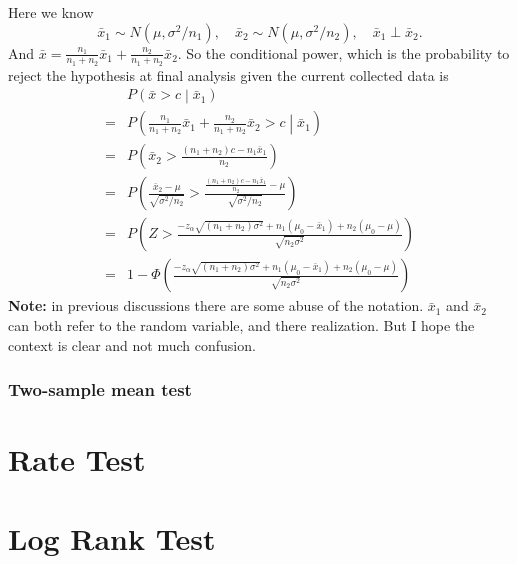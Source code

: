 \documentclass[a4paper,12pt]{article}
\begin{document}
Here we know
\[
  \bar{x}_1 \sim N\left(\mu, \sigma^2 / n_1\right)
  ,\quad
  \bar{x}_2 \sim N\left(\mu, \sigma^2 / n_2\right)
  ,\quad
  \bar{x}_1 \perp \bar{x}_2
  .
\]
And $\bar{x} = \frac{n_1}{n_1 + n_2}\bar{x}_1 + \frac{n_2}{n_1 + n_2}\bar{x}_2$. So the conditional power, which is the probability to reject the hypothesis at final analysis given the current collected data is
\begin{equation}
  \label{eq:cp_normal_sigma_known_one_sample}
  \begin{aligned}
    & P\left(\bar{x} > c \middle| \bar{x}_1\right)    \\
    =& P\left(
      \frac{n_1}{n_1 + n_2}\bar{x}_1 + \frac{n_2}{n_1 + n_2}\bar{x}_2 > c\middle| \bar{x}_1
    \right)    \\
    =& P\left(
      \bar{x}_2 > \frac{\left(n_1 + n_2\right)c - n_1\bar{x}_1}{n_2}
    \right)    \\
    =& P\left(
      \frac{\bar{x}_2 - \mu}{\sqrt{\sigma^2/n_2}}
      > \frac{
        \frac{\left(n_1 + n_2\right)c - n_1\bar{x}_1}{n_2}- \mu
      }{\sqrt{\sigma^2/n_2}}
    \right)    \\
    =& P\left(
      Z > \frac{
        -z_{\alpha}\sqrt{\left(n_1 + n_2\right)\sigma^2}
        + n_1\left(\mu_0 - \bar{x}_1\right)
        + n_2\left(\mu_0 - \mu\right)
      }{\sqrt{n_2\sigma^2}}
    \right)    \\
    =& 1 - \Phi\left(
      \frac{
        -z_{\alpha}\sqrt{\left(n_1 + n_2\right)\sigma^2}
        + n_1\left(\mu_0 - \bar{x}_1\right)
        + n_2\left(\mu_0 - \mu\right)
      }{\sqrt{n_2\sigma^2}}
    \right)
  \end{aligned}
\end{equation}
\textbf{Note:} in previous discussions there are some abuse of the notation. $\bar{x}_1$ and $\bar{x}_2$ can both refer to the random variable, and there realization. But I hope the context is clear and not much confusion.

\subsubsection{Two-sample mean test}
\label{sec:two-sample-mean}



\section{Rate Test}
\label{sec:rate-test}

\section{Log Rank Test}
\label{sec:log-rank-test}






\clearpage
\appendix
\end{document}
